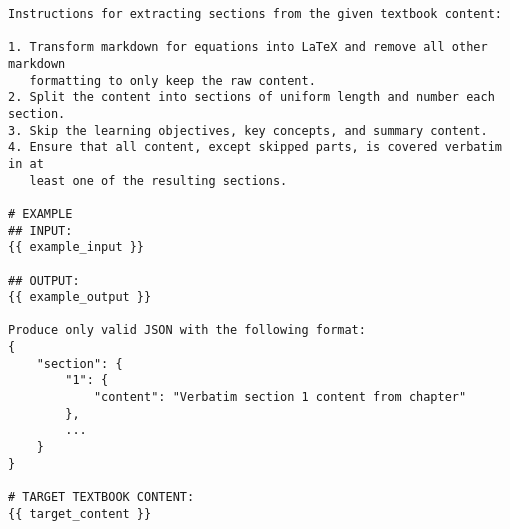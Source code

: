 \begin{tcolorbox}[title=Extracting Sections, myboxstyle, breakable]
\begin{verbatim}
Instructions for extracting sections from the given textbook content: 

1. Transform markdown for equations into LaTeX and remove all other markdown 
   formatting to only keep the raw content.  
2. Split the content into sections of uniform length and number each section.  
3. Skip the learning objectives, key concepts, and summary content.  
4. Ensure that all content, except skipped parts, is covered verbatim in at 
   least one of the resulting sections.  

# EXAMPLE  
## INPUT:  
{{ example_input }}  

## OUTPUT:  
{{ example_output }}  

Produce only valid JSON with the following format:
{
    "section": {
        "1": {
            "content": "Verbatim section 1 content from chapter"
        },
        ...
    }
}

# TARGET TEXTBOOK CONTENT: 
{{ target_content }}
\end{verbatim}
\end{tcolorbox}
\label{appdx:section-prompt}
